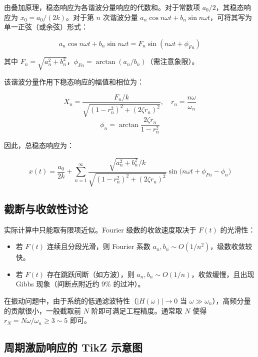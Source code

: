 由叠加原理，稳态响应为各谐波分量响应的代数和。对于常数项 $a_0/2$，其稳态响应为 $x_0 = a_0/(2k)$。对于第 $n$ 次谐波分量 $a_n \cos n\omega t + b_n \sin n\omega t$，可将其写为单一正弦（或余弦）形式：

\[
a_n \cos n\omega t + b_n \sin n\omega t = F_n \sin(n\omega t + \phi_{Fn})
\]

其中 $F_n = \sqrt{a_n^2 + b_n^2}$，$\phi_{Fn} = \arctan(a_n/b_n)$（需注意象限）。

该谐波分量作用下稳态响应的幅值和相位为：

\begin{myformula}
\[
X_n = \frac{F_n/k}{\sqrt{(1 - r_n^2)^2 + (2\zeta r_n)^2}},\quad r_n = \frac{n\omega}{\omega_n}
\]
\[
\phi_n = \arctan\frac{2\zeta r_n}{1 - r_n^2}
\]
\end{myformula}

因此，总稳态响应为：

\begin{myformula}
\[
x(t) = \frac{a_0}{2k} + \sum_{n=1}^{\infty} \frac{\sqrt{a_n^2 + b_n^2}/k}{\sqrt{(1 - r_n^2)^2 + (2\zeta r_n)^2}} \sin\bigl( n\omega t + \phi_{Fn} - \phi_n \bigr)
\]
\end{myformula}

\subsection{截断与收敛性讨论}

实际计算中只能取有限项近似。Fourier 级数的收敛速度取决于 $F(t)$ 的光滑性：

\begin{itemize}
\item 若 $F(t)$ 连续且分段光滑，则 Fourier 系数 $a_n, b_n \sim O(1/n^2)$，级数收敛较快。
\item 若 $F(t)$ 存在跳跃间断（如方波），则 $a_n, b_n \sim O(1/n)$，收敛缓慢，且出现 Gibbs 现象（间断点附近约 9\% 的过冲）。
\end{itemize}

在振动问题中，由于系统的低通滤波特性（$|H(\omega)| \to 0$ 当 $\omega \gg \omega_n$），高频分量的贡献很小，一般截取前 $N$ 阶即可满足工程精度。通常取 $N$ 使得 $r_N = N\omega/\omega_n \geq 3\sim5$ 即可。

\subsection{周期激励响应的 TikZ 示意图}

